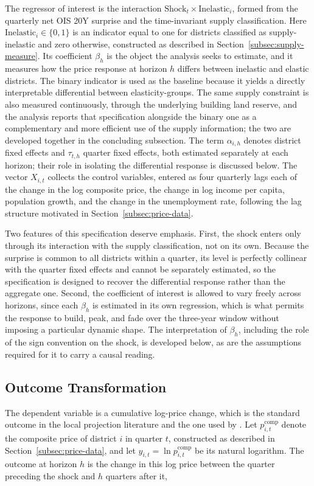 \documentclass[a4paper,12pt, headsepline]{scrartcl}
\numberwithin{equation}{section}
\begin{document}
The regressor of interest is the interaction $\text{Shock}_t \times \text{Inelastic}_i$, formed from the quarterly net OIS 20Y surprise and the time-invariant supply classification. Here $\text{Inelastic}_i \in \{0, 1\}$ is an indicator equal to one for districts classified as supply-inelastic and zero otherwise, constructed as described in Section~\ref{subsec:supply-measure}. Its coefficient $\beta_h$ is the object the analysis seeks to estimate, and it measures how the price response at horizon $h$ differs between inelastic and elastic districts. The binary indicator is used as the baseline because it yields a directly interpretable differential between elasticity-groups. The same supply constraint is also measured continuously, through the underlying building land reserve, and the analysis reports that specification alongside the binary one as a complementary and more efficient use of the supply information; the two are developed together in the concluding subsection. The term $\alpha_{i,h}$ denotes district fixed effects and $\tau_{t,h}$ quarter fixed effects, both estimated separately at each horizon; their role in isolating the differential response is discussed below. The vector $X_{i,t}$ collects the control variables, entered as four quarterly lags each of the change in the log composite price, the change in log income per capita, population growth, and the change in the unemployment rate, following the lag structure motivated in Section~\ref{subsec:price-data}.

Two features of this specification deserve emphasis. First, the shock enters only through its interaction with the supply classification, not on its own. Because the surprise is common to all districts within a quarter, its level is perfectly collinear with the quarter fixed effects and cannot be separately estimated, so the specification is designed to recover the differential response rather than the aggregate one. Second, the coefficient of interest is allowed to vary freely across horizons, since each $\beta_h$ is estimated in its own regression, which is what permits the response to build, peak, and fade over the three-year window without imposing a particular dynamic shape. The interpretation of $\beta_h$, including the role of the sign convention on the shock, is developed below, as are the assumptions required for it to carry a causal reading.

\subsection{Outcome Transformation}\label{subsec:outcome}
The dependent variable is a cumulative log-price change, which is the standard outcome in the local projection literature \citep{jorda2005, jorda2023} and the one used by \citet{aastveit2022}. Let $p^{\text{comp}}_{i,t}$ denote the composite price of district $i$ in quarter $t$, constructed as described in Section~\ref{subsec:price-data}, and let $y_{i,t} = \ln p^{\text{comp}}_{i,t}$ be its natural logarithm. The outcome at horizon $h$ is the change in this log price between the quarter preceding the shock and $h$ quarters after it,
\end{document}
